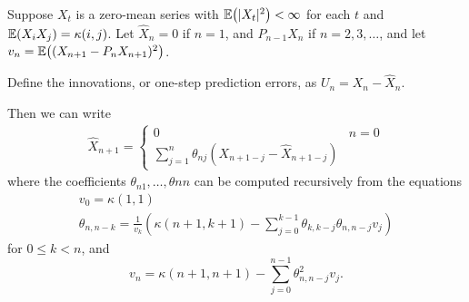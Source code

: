 \begin{thm}
  \label{defn:stationary_processes:2}
  Suppose $X_{t}$ is a zero-mean series with $\E{|X_{t}|^{2}} <
  \infty$ for each $t$ and $\E{X_{i} X_{j}} = \kappa(i, j)$.
  Let $\hat X_{n} = 0$ if $n = 1$, and $P_{n-1} X_{n}$ if $n = 2, 3,
  \dots$, and let $v_{n} = \E{(X_{n+1} - P_{n} X_{n+1})^{2}}$.

  Define the innovations, or one-step prediction errors, as $U_{n} =
  X_{n} - \hat X_{n}$.

  Then we can write
  \begin{align}
    \label{eq:16}
    \hat X_{n+1} =
    \begin{cases}
      0 & n = 0 \\
      \sum_{j=1}^{n} \theta_{nj}(X_{n+1-j} - \hat X_{n+1 - j})
    \end{cases}
  \end{align}
  where the coefficients $\theta_{n1}, \dots, \theta{nn}$ can be
  computed recursively from the equations
  \begin{align}
    \label{eq:17}
    v_{0} = \kappa(1, 1) \\
    \theta_{n, n-k} = \frac{1}{v_{k}}(\kappa(n+1, k+1) -
    \sum_{j=0}^{k-1} \theta_{k, k-j} \theta_{n, n-j} v_{j})
  \end{align}  for $0 \leq k < n$, and
  \begin{equation}
    \label{eq:18}
    v_{n} = \kappa(n+1, n+1) - \sum_{j=0}^{n-1} \theta^{2}_{n, n-j} v_{j}.
  \end{equation}
\end{thm}



